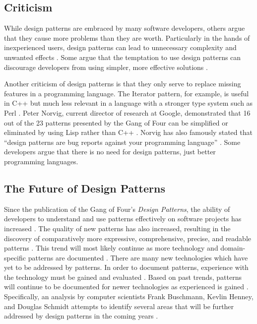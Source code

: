 \documentclass[11pt]{article}
\begin{document}
\subsection{Criticism}

While design patterns are embraced by many software developers, others argue that they cause more problems than they are worth. Particularly in the hands of inexperienced users, design patterns can lead to unnecessary complexity and unwanted effects \cite{dominus2002}. Some argue that the temptation to use design patterns can discourage developers from using simpler, more effective solutions \cite{dominus2002}. 

Another criticism of design patterns is that they only serve to replace missing features in a programming language. The Iterator pattern, for example, is useful in C++ but much less relevant in a language with a stronger type system such as Perl \cite{dominus2002}. Peter Norvig, current director of research at Google, demonstrated that 16 out of the 23 patterns presented by the Gang of Four can be simplified or eliminated by using Lisp rather than C++ \cite{norvig1996}. Norvig has also famously stated that ``design patterns are bug reports against your programming language'' \cite{norvig1996}. Some developers argue that there is no need for design patterns, just better programming languages.


\subsection{The Future of Design Patterns}

Since the publication of the Gang of Four's \textit{Design Patterns}, the ability of developers to understand and use patterns effectively on software projects has increased \cite{buschmann2007}. The quality of new patterns has also increased, resulting in the discovery of comparatively more expressive, comprehensive, precise, and readable patterns \cite{buschmann2007}. This trend will most likely continue as more technology and domain-specific patterns are documented \cite{buschmann2007}. There are many new technologies which have yet to be addressed by patterns. In order to document patterns, experience with the technology must be gained and evaluated \cite{buschmann2007}. Based on past trends, patterns will continue to be documented for newer technologies as experienced is gained \cite{buschmann2007}. Specifically, an analysis by computer scientists Frank Buschmann, Kevlin Henney, and Douglas Schmidt attempts to identify several areas that will be further addressed by design patterns in the coming years \cite{buschmann2007}.
\end{document}
